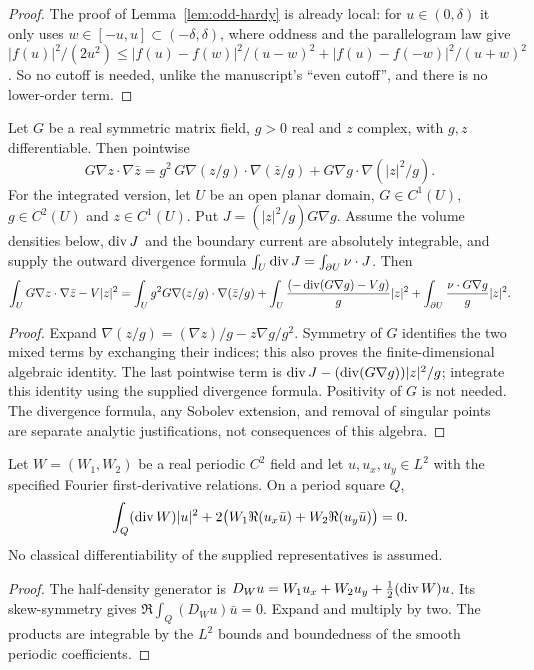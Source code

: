 \begin{proof}
\leanok
The proof of Lemma~\ref{lem:odd-hardy} is already local: for $u\in(0,\delta)$ it only uses
$w\in[-u,u]\subset(-\delta,\delta)$, where oddness and the parallelogram law give
$|f(u)|^2/(2u^2)\le|f(u)-f(w)|^2/(u-w)^2+|f(u)-f(-w)|^2/(u+w)^2$. So no cutoff is needed, unlike
the manuscript's ``even cutoff'', and there is no lower-order term.
\end{proof}

\begin{lemma}
\label{lem:picone}
\leanok
Let $G$ be a real symmetric matrix field, $g>0$ real and $z$ complex,
with $g,z$ differentiable. Then pointwise
\[
  G\nabla z\cdot\nabla\bar z
  =g^2\,G\nabla(z/g)\cdot\nabla(\bar z/g)+G\nabla g\cdot\nabla(|z|^2/g).
\]
For the integrated version, let $U$ be an open planar domain,
$G\in C^1(U)$, $g\in C^2(U)$ and $z\in C^1(U)$.
Put $J=(|z|^2/g)G\nabla g$. Assume the volume densities below,
$\operatorname{div} J$ and the boundary current are absolutely integrable, and supply
the outward divergence formula
$\int_U\operatorname{div} J=\int_{\partial U}\nu\cdot J$.
Then
\[
  \int_U G\nabla z\cdot\nabla\bar z-V|z|^2
  =\int_U g^2G\nabla(z/g)\cdot\nabla(\bar z/g)
   +\int_U\frac{(-\operatorname{div}(G\nabla g)-Vg)}{g}|z|^2
   +\int_{\partial U}\frac{\nu\cdot G\nabla g}{g}|z|^2 .
\]
\end{lemma}

\begin{proof}
\leanok
Expand $\nabla(z/g)=(\nabla z)/g-z\nabla g/g^2$.
Symmetry of $G$ identifies the two mixed terms by exchanging their
indices; this also proves the finite-dimensional algebraic identity.
The last pointwise term is
$\operatorname{div} J-(\operatorname{div}(G\nabla g))|z|^2/g$; integrate this identity using
the supplied divergence formula. Positivity of $G$ is not needed.
The divergence formula, any Sobolev extension, and removal of singular
points are separate analytic justifications, not consequences of this algebra.
\end{proof}

\begin{lemma}
\label{lem:quadratic-weak-ibp}
\leanok
Let $W=(W_1,W_2)$ be a real periodic $C^2$ field and let $u,u_x,u_y\in L^2$
with the specified Fourier first-derivative relations. On a period square $Q$,
\[
 \int_Q (\operatorname{div} W)|u|^2+
   2\bigl(W_1\Re(u_x\bar u)+W_2\Re(u_y\bar u)\bigr)=0.
\]
No classical differentiability of the supplied representatives is assumed.
\end{lemma}

\begin{proof}
\leanok
The half-density generator is
$D_Wu=W_1u_x+W_2u_y+\frac12(\operatorname{div} W)u$.
Its skew-symmetry gives $\Re\int_Q(D_Wu)\bar u=0$.
Expand and multiply by two. The products are integrable by the $L^2$
bounds and boundedness of the smooth periodic coefficients.
\end{proof}
